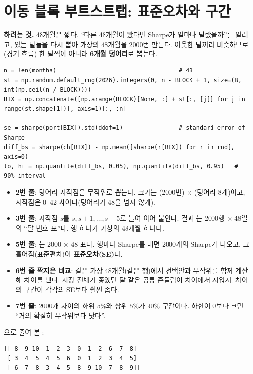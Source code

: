 \section{이동 블록 부트스트랩: 표준오차와 구간}
\textbf{하려는 것.} 48개월은 짧다. ``다른 48개월이 왔다면 Sharpe가 얼마나 달랐을까''를 알려고, 있는 달들을 다시 뽑아 가상의 48개월을 2000번 만든다. 이웃한 달끼리 비슷하므로(경기 흐름) 한 달씩이 아니라 \textbf{6개월 덩어리}로 뽑는다.
\begin{lstlisting}
n = len(months)                                   # 48
st = np.random.default_rng(2026).integers(0, n - BLOCK + 1, size=(B, int(np.ceil(n / BLOCK))))
BIX = np.concatenate([np.arange(BLOCK)[None, :] + st[:, [j]] for j in range(st.shape[1])], axis=1)[:, :n]

se = sharpe(port[BIX]).std(ddof=1)                # standard error of Sharpe
diff_bs = sharpe(ch[BIX]) - np.mean([sharpe(r[BIX]) for r in rnd], axis=0)
lo, hi = np.quantile(diff_bs, 0.05), np.quantile(diff_bs, 0.95)   # 90% interval
\end{lstlisting}
\begin{itemize}[leftmargin=*]
\item \textbf{2번 줄}: 덩어리 시작점을 무작위로 뽑는다. 크기는 (2000번) \ensuremath{\times} (덩어리 8개)이고, 시작점은 0--42 사이다(덩어리가 48을 넘지 않게).
\item \textbf{3번 줄}: 시작점 $s$를 $s, s+1, \ldots, s+5$로 늘여 이어 붙인다. 결과 는 2000행 \ensuremath{\times} 48열의 ``달 번호 표''다. 행 하나가 가상의 48개월 하나다.
\item \textbf{5번 줄}: 는 2000 \ensuremath{\times} 48 표다. 행마다 Sharpe를 내면 2000개의 Sharpe가 나오고, 그 흩어짐(표준편차)이 \textbf{표준오차(SE)}다.
\item \textbf{6번 줄} \textbf{짝지은 비교}: 같은 가상 48개월(같은  행)에서 선택안과 무작위를 함께 계산해 차이를 낸다. 시장 전체가 좋았던 달 같은 공통 흔들림이 차이에서 지워져, 차이의 구간이 각각의 SE보다 훨씬 좁다.
\item \textbf{7번 줄}: 2000개 차이의 하위 5\%와 상위 5\%가 90\% 구간이다. 하한이 0보다 크면 ``거의 확실히 무작위보다 낫다''.
\end{itemize}
\begin{workout}
으로 줄여 본 :
\begin{lstlisting}[style=out]
[[ 8  9 10  1  2  3  0  1  2  6  7  8]
 [ 3  4  5  4  5  6  0  1  2  3  4  5]
 [ 6  7  8  3  4  5  8  9 10  7  8  9]]
\end{lstlisting}
\end{workout}

